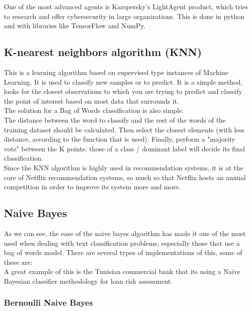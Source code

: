 \documentclass[sigconf,12pt,review=false,natbib=false]{acmart}
\begin{document}
One of the most advanced agents is Karspersky's LightAgent product, which tries to research and offer cybersecurity
in large organizations. This is done in python and with libraries like TensorFlow and NumPy. \\

\subsection{K-nearest neighbors algorithm (KNN)}

This is a learning algorithm based on supervised type instances of Machine Learning. It is used to classify new samples
or to predict. It is a simple method, looks for the closest observations to which you are trying to predict and classify
the point of interest based on most data that surrounds it. \\

The solution for a Bag of Words classification is also simple. \\

The distance between the word to classify and the rest of the words of the training dataset should be calculated. Then
select the closest elements (with less distance, according to the function that is used). Finally, perform a "majority
vote" between the K points: those of a class / dominant label will decide its final classification. \\

Since the KNN algorithm is highly used in recommendation systems, it is at the core of Netflix recommendation systems,
so much so that Netflix hosts an annual competition in order to improve its system more and more. \\

\subsection{Naive Bayes}

As we can see, the ease of the naive bayes algorithm has made it one of the most used when dealing
with text classification problems, especially those that use a bag of words model. There are several types of
implementations of this, some of these are:\\

A great example of this is the Tunisian commercial bank that its using a Naive Bayesian classifier methodology
for loan risk assessment. \\

\subsubsection{Bernoulli Naive Bayes}
\end{document}
